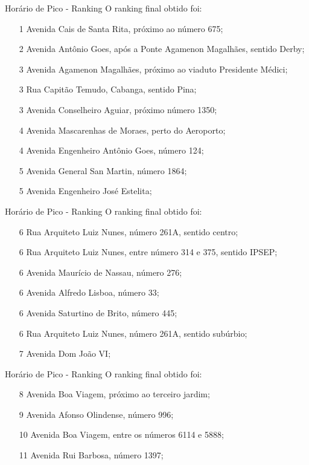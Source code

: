 \begin{frame}{Horário de Pico - Ranking}
O ranking final obtido foi:
\begin{enumerate}
	\item[1] Avenida Cais de Santa Rita, próximo ao número 675;
	\item[2] Avenida Antônio Goes, após a Ponte Agamenon Magalhães, sentido Derby;
	\item[3] Avenida Agamenon Magalhães, próximo ao viaduto Presidente Médici;
	\item[3] Rua Capitão Temudo, Cabanga, sentido Pina;
	\item[3] Avenida Conselheiro Aguiar, próximo número 1350;
	\item[4] Avenida Mascarenhas de Moraes, perto do Aeroporto;
	\item[4] Avenida Engenheiro Antônio Goes, número 124;
	\item[5] Avenida General San Martin, número 1864;
	\item[5] Avenida Engenheiro José Estelita;
\end{enumerate}
\end{frame}

\begin{frame}{Horário de Pico - Ranking}
O ranking final obtido foi:
\begin{enumerate}
\item[6] Rua Arquiteto Luiz Nunes, número 261A, sentido centro;
\item[6] Rua Arquiteto Luiz Nunes, entre número 314 e 375, sentido IPSEP;
\item[6] Avenida Maurício de Nassau, número 276;
\item[6] Avenida Alfredo Lisboa, número 33;
\item[6] Avenida Saturtino de Brito, número 445;
\item[6] Rua Arquiteto Luiz Nunes, número 261A, sentido subúrbio;
\item[7] Avenida Dom João VI;
\end{enumerate}
\end{frame}

\begin{frame}{Horário de Pico - Ranking}
O ranking final obtido foi:
\begin{enumerate}
\item[8] Avenida Boa Viagem, próximo ao terceiro jardim;
\item[9] Avenida Afonso Olindense, número 996;
\item[10] Avenida Boa Viagem, entre os números 6114 e 5888;
\item[11] Avenida Rui Barbosa, número 1397;
\end{enumerate}
\end{frame}

